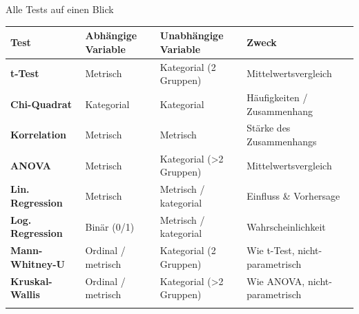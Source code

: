 \documentclass[
  ignorenonframetext,
]{beamer}
\newcounter{none} %
\begin{document}
\begin{frame}{Alle Tests auf einen Blick}
\protect{}\label{alle-tests-auf-einen-blick}
{\def\LTcaptype{none} %
\begin{longtable}[]{@{}
  >{\raggedright\arraybackslash}p{}
  >{\raggedright\arraybackslash}p{}
  >{\raggedright\arraybackslash}p{}
  >{\raggedright\arraybackslash}p{}@{}}
\toprule\noalign{}
\begin{minipage}[b]{\linewidth}\raggedright
Test
\end{minipage} & \begin{minipage}[b]{\linewidth}\raggedright
Abhängige Variable
\end{minipage} & \begin{minipage}[b]{\linewidth}\raggedright
Unabhängige Variable
\end{minipage} & \begin{minipage}[b]{\linewidth}\raggedright
Zweck
\end{minipage} \\
\midrule\noalign{}
\endhead
\textbf{t-Test} & Metrisch & Kategorial (2 Gruppen) &
Mittelwertsvergleich \\
\textbf{Chi-Quadrat} & Kategorial & Kategorial & Häufigkeiten /
Zusammenhang \\
\textbf{Korrelation} & Metrisch & Metrisch & Stärke des Zusammenhangs \\
\textbf{ANOVA} & Metrisch & Kategorial (\textgreater2 Gruppen) &
Mittelwertsvergleich \\
\textbf{Lin. Regression} & Metrisch & Metrisch / kategorial & Einfluss
\& Vorhersage \\
\textbf{Log. Regression} & Binär (0/1) & Metrisch / kategorial &
Wahrscheinlichkeit \\
\textbf{Mann-Whitney-U} & Ordinal / metrisch & Kategorial (2 Gruppen) &
Wie t-Test, nicht-parametrisch \\
\textbf{Kruskal-Wallis} & Ordinal / metrisch & Kategorial (\textgreater2
Gruppen) & Wie ANOVA, nicht-parametrisch \\
\bottomrule\noalign{}
\end{longtable}
}
\end{frame}
\end{document}
